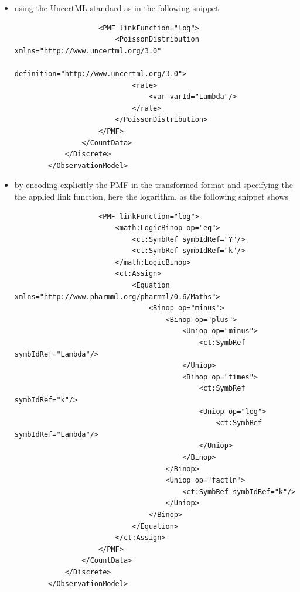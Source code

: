 \begin{itemize}
\item
using the UncertML standard as in the following snippet
\lstset{language=XML}
\begin{lstlisting}
                    <PMF linkFunction="log">
                        <PoissonDistribution xmlns="http://www.uncertml.org/3.0" 
                            definition="http://www.uncertml.org/3.0">
                            <rate>
                                <var varId="Lambda"/>
                            </rate>
                        </PoissonDistribution>
                    </PMF>
                </CountData>
            </Discrete>
        </ObservationModel>
\end{lstlisting}
\item
by encoding explicitly the PMF in the transformed format and specifying the
the applied link function, here the logarithm, as the following snippet shows
\lstset{language=XML}
\begin{lstlisting}
                    <PMF linkFunction="log">
                        <math:LogicBinop op="eq">
                            <ct:SymbRef symbIdRef="Y"/>
                            <ct:SymbRef symbIdRef="k"/>
                        </math:LogicBinop>
                        <ct:Assign>
                            <Equation xmlns="http://www.pharmml.org/pharmml/0.6/Maths">
                                <Binop op="minus">
                                    <Binop op="plus">
                                        <Uniop op="minus">
                                            <ct:SymbRef symbIdRef="Lambda"/>
                                        </Uniop>
                                        <Binop op="times">
                                            <ct:SymbRef symbIdRef="k"/>
                                            <Uniop op="log">
                                                <ct:SymbRef symbIdRef="Lambda"/>
                                            </Uniop>
                                        </Binop>
                                    </Binop>
                                    <Uniop op="factln">
                                        <ct:SymbRef symbIdRef="k"/>
                                    </Uniop>
                                </Binop>
                            </Equation>
                        </ct:Assign>
                    </PMF>
                </CountData>
            </Discrete>
        </ObservationModel> 
\end{lstlisting}
\end{itemize}

